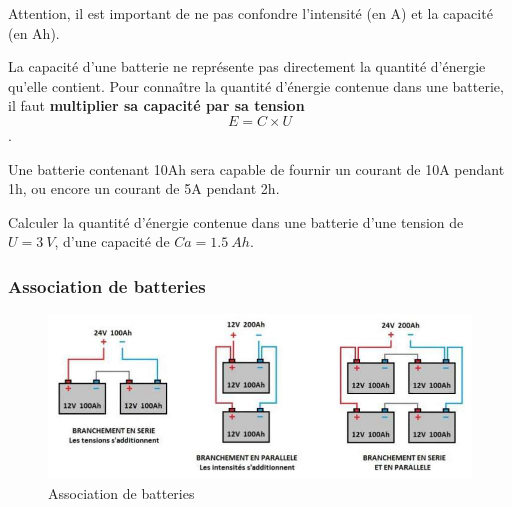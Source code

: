 \documentclass[10pt,fleqn]{article} %
\begin{document}
\begin{warn}
    Attention, il est important de ne pas confondre l'intensité (en \si{A}) et la capacité (en \si{Ah}).
\end{warn}

\begin{warn}
    La capacité d'une batterie ne représente pas directement la quantité d'énergie qu'elle contient. Pour connaître la quantité d'énergie contenue dans une batterie, il faut \textbf{multiplier sa capacité par sa tension} $$E = C \times U$$.
\end{warn}

\begin{rem}
        Une batterie contenant 10Ah sera capable de fournir un courant de 10A pendant 1h, ou encore un courant de 5A pendant 2h. 
\end{rem}

\begin{exemple}
    Calculer la quantité d'énergie contenue dans une batterie d'une tension de $U = \SI{3}{V}$, d'une capacité de $Ca=\SI{1.5}{Ah}$.
\end{exemple}
\begin{correction}
\end{correction}

\subsubsection{Association de batteries}

\begin{figure}[h]
    \centering
    \includegraphics[width=\textwidth]{images/association.png}
    \caption{Association de batteries}
    \label{fig:association}
\end{figure}
\end{document}
